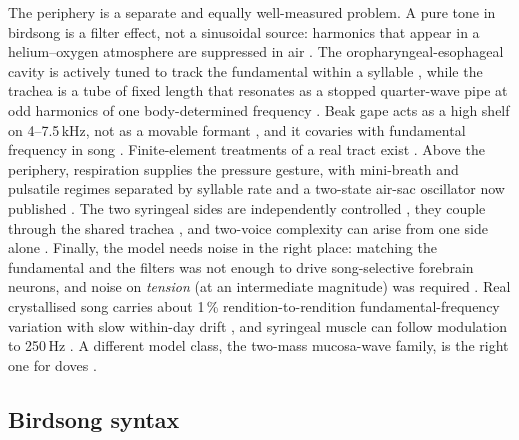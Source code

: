 \documentclass[10pt,twocolumn,a4paper]{article}
\begin{document}
The periphery is a separate and equally well-measured problem. A pure tone in birdsong is
a filter effect, not a sinusoidal source: harmonics that appear in a helium--oxygen
atmosphere are suppressed in air \citep{nowicki1987,beckers2003}. The
oropharyngeal-esophageal cavity is actively tuned to track the fundamental within a
syllable \citep{riede2006}, while the trachea is a tube of fixed length that resonates as a
stopped quarter-wave pipe at odd harmonics of one body-determined
frequency \citep{nelson2005,riede2009}. Beak gape acts as a high shelf on 4--7.5\,kHz, not as a movable formant \citep{nelson2005}, and it covaries with fundamental
frequency in song \citep{ohms2010,podos2004}. Finite-element treatments of a real tract
exist \citep{fletcher2006,kazemi2023}. Above the periphery, respiration supplies the
pressure gesture, with mini-breath and pulsatile regimes separated by syllable
rate \citep{hartley1989} and a two-state air-sac oscillator now
published \citep{fainstein2025}. The two syringeal sides are independently
controlled \citep{suthers1990,goller1996a}, they couple through the shared
trachea \citep{laje2005}, and two-voice complexity can arise from one side
alone \citep{zollinger2008}. Finally, the model needs noise in the right place: matching
the fundamental and the filters was not enough to drive song-selective forebrain neurons,
and noise on \emph{tension} (at an intermediate magnitude) was
required \citep{amador2021}. Real crystallised song carries about 1\,\% rendition-to-rendition
fundamental-frequency variation \citep{tumer2007} with slow within-day
drift \citep{wood2013}, and syringeal muscle can follow modulation to
250\,Hz \citep{elemans2008,riedegoller2010}. A different model class, the two-mass
mucosa-wave family, is the right one for doves \citep{elemans2008dove}.

\subsection{Birdsong syntax}
\end{document}
